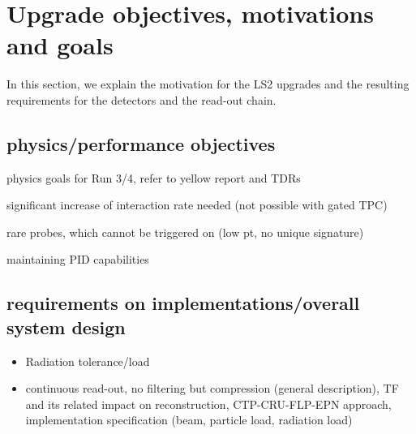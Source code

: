 \section{Upgrade objectives, motivations and goals}

In this section, we explain the motivation for the LS2 upgrades and the
resulting requirements for the detectors and the read-out chain.

\subsection{physics/performance objectives}

physics goals for Run 3/4, refer to yellow report and TDRs~\cite{Citron:2018lsq}

significant increase of interaction rate needed (not possible with gated TPC)

rare probes, which cannot be triggered on (low pt, no unique signature)

maintaining PID capabilities

\subsection{requirements on implementations/overall system design}
\begin{itemize}
\item Radiation tolerance/load
\item continuous read-out, no filtering but compression (general description), TF and its related impact on reconstruction, CTP-CRU-FLP-EPN approach, implementation specification (beam, particle load, radiation load)
\end{itemize}
